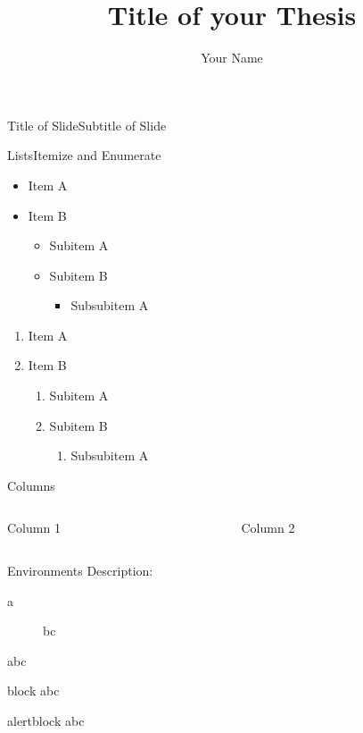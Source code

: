 \documentclass[AIRbeamer%
               ,optBiber%
               ,optBibstyleAlphabetic%
               ,optBeamerClassicFormat%
               ]{AIRlatex}%
\title[Short-Title]{Title of your Thesis}%
\author[Short-Name]{Your Name}%
\date{\AIRutilsDate{1}{1}{2017}}%
\begin{document}
%
%
\AIRbeamerTitlePageStudentThesis%
%
\begin{frame}{Title of Slide}{Subtitle of Slide}%
    \blindtext%
\end{frame}%
%
%
%
\begin{frame}{Lists}{Itemize and Enumerate}%
    \begin{itemize}
        \item Item A
        \item Item B
        \begin{itemize}
            \item Subitem A
            \item Subitem B
            \begin{itemize}
                \item Subsubitem A
            \end{itemize}
        \end{itemize}
    \end{itemize}
    \begin{enumerate}
        \item Item A
        \item Item B
        \begin{enumerate}
            \item Subitem A
            \item Subitem B
            \begin{enumerate}
                \item Subsubitem A
            \end{enumerate}
        \end{enumerate}
    \end{enumerate}
\end{frame}%
%
\begin{frame}{Columns}%
    \begin{columns}[T,onlytextwidth]%
        \begin{column}[T]{0.48\textwidth}%
            Column 1%
        \end{column}%
        \begin{column}[T]{0.48\textwidth}%
            Column 2%
        \end{column}%
    \end{columns}%
\end{frame}%
%
\begin{frame}{Environments}%
    Description:%
    \begin{description}%
      \item [a] bc%
    \end{description}%
    \begin{theorem}%
      abc%
    \end{theorem}%
    \begin{block}{block}%
      abc%
    \end{block}%
    \begin{alertblock}{alertblock}%
      abc%
    \end{alertblock}%
\end{frame}%
\end{document}
